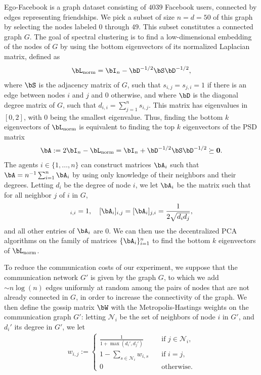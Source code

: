 \documentclass{article}
\theoremstyle{plain}
\theoremstyle{definition}
\theoremstyle{remark}
\begin{document}
Ego-Facebook \cite{leskovec12} is a graph dataset consisting of $4039$ Facebook users, connected by edges representing friendships. We pick a subset of size $n=d=50$ of this graph by selecting the nodes labeled $0$ through $49$. This subset constitutes a connected graph $G$. The goal of spectral clustering is to find a low-dimensional embedding of the nodes of $G$ by using the bottom eigenvectors of its normalized Laplacian matrix, defined as
\begin{align*}
  \bL_{\mathrm{norm}} = \bI_n - \bD^{-1/2} \bS \bD^{-1/2},
\end{align*}
where $\bS$ is the adjacency matrix of $G$, such that $s_{i,j} = s_{j,i} = 1$ if there is an edge between nodes $i$ and $j$ and $0$ otherwise, and where $\bD$ is the diagonal degree matrix of $G$, such that $d_{i,i} = \sum_{j=1}^n s_{i,j}$. This matrix has eigenvalues in $[0,2]$, with $0$ being the smallest eigenvalue. Thus, finding the bottom $k$ eigenvectors of $\bL_{\mathrm{norm}}$ is equivalent to finding the top $k$ eigenvectors of the PSD matrix
\begin{align*}
  \bA := 2\bI_n - \bL_{\mathrm{norm}} = \bI_n + \bD^{-1/2} \bS \bD^{-1/2} \succeq \mathbf{0}.
\end{align*}
The agents $i \in \{1,\dots,n\}$ can construct matrices $\bA_i$ such that $\bA = n^{-1}\sum_{i=1}^n \bA_i$ by using only knowledge of their neighbors and their degrees. Letting $d_i$ be the degree of node $i$, we let $\bA_i$ be the matrix such that for all neighbor $j$ of $i$ in $G$,
\begin{align*}
  [\bA_i]_{i,i} = 1, \quad [\bA_i]_{i,j} = [\bA_i]_{j,i} = \frac{1}{2\sqrt{d_i d_j}},
\end{align*}
and all other entries of $\bA_i$ are $0$. We can then use the decentralized PCA algorithms on the family of matrices $\{\bA_i\}_{i=1}^n$ to find the bottom $k$ eigenvectors of $\bL_{\mathrm{norm}}$. 

To reduce the communication costs of our experiment, we suppose that the communication network $G'$ is given by the graph $G$, to which we add $\sim n\log(n)$ edges uniformly at random among the pairs of nodes that are not already connected in $G$, in order to increase the connectivity of the graph. We then define the gossip matrix $\bW$ with the Metropolis-Hastings weights on the communication graph $G'$: letting $\mathcal{N}_i$ be the set of neighbors of node $i$ in $G'$, and $d_i'$ its degree in $G'$, we let
\begin{align*}
  w_{i,j} := \begin{cases}
    \frac{1}{1+\max(d_i', d_j')} & \text{if } j \in \mathcal{N}_i, \\
    1 - \sum_{s \in \mathcal{N}_i} w_{i,s} \quad & \text{if } i=j, \\
    0 & \text{otherwise}.
  \end{cases}
\end{align*}
\end{document}
